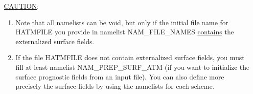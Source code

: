 \begin{enumerate}
\underline{CAUTION}: 
\begin{enumerate}
\item Note that all namelists can be void, but only if the initial file name for HATMFILE you provide in namelist NAM\_FILE\_NAMES \underline{contains} the externalized surface fields.
\item If the file HATMFILE does not contain externalized surface fields, you must fill at least namelist NAM\_PREP\_SURF\_ATM (if you want to initialize the surface prognostic fields from an input file). You can also define more precisely the surface fields by using the namelists for each scheme.
\end{enumerate}

\end{enumerate}




